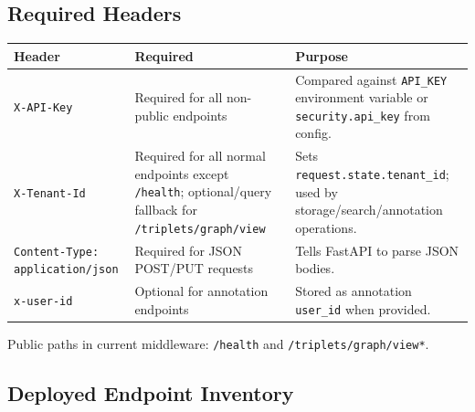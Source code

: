 \documentclass[10pt,letterpaper]{article}
\begin{document}
\subsection{Required Headers}

\begin{scriptsize}
\begin{longtable}{>{\raggedright\arraybackslash}p{2.23in}>{\raggedright\arraybackslash}p{2.23in}>{\raggedright\arraybackslash}p{2.23in}}
Header & Required & Purpose \\
\hline
\texttt{X-API-Key} & Required for all non-public endpoints & Compared against \texttt{API\_KEY} environment variable or \texttt{security.api\_key} from config. \\
\texttt{X-Tenant-Id} & Required for all normal endpoints except \texttt{/health}; optional/query fallback for \texttt{/triplets/graph/view} & Sets \texttt{request.state.tenant\_id}; used by storage/search/annotation operations. \\
\texttt{Content-Type: application/json} & Required for JSON POST/PUT requests & Tells FastAPI to parse JSON bodies. \\
\texttt{x-user-id} & Optional for annotation endpoints & Stored as annotation \texttt{user\_id} when provided. \\
\end{longtable}
\end{scriptsize}

Public paths in current middleware: \texttt{/health} and \texttt{/triplets/graph/view*}.

\subsection{Deployed Endpoint Inventory}
\end{document}
